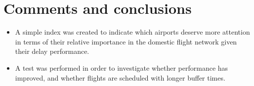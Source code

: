 \documentclass[a4paper, 11pt]{article}
\begin{document}
\section*{Comments and conclusions}

\begin{itemize}
\item A simple index was created to indicate which airports deserve more attention in terms of their relative importance in the domestic flight network given their delay performance.
\item A test was performed in order to investigate whether performance has improved, and whether flights are scheduled with longer buffer times.
\end{itemize}

\end{document}
